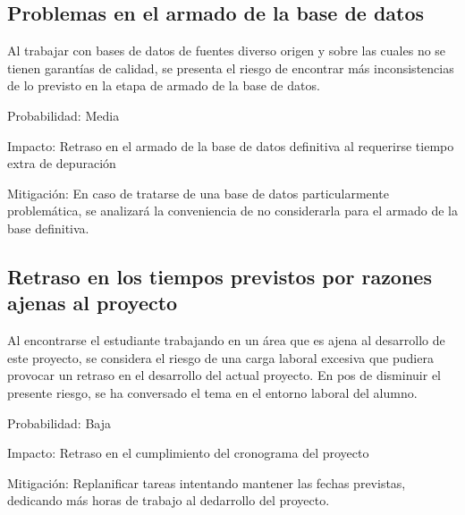 \documentclass[bibliography=openstyle,DIV=12]{scrartcl}
\begin{document}
\subsection{Problemas en el armado de la base de datos}
Al trabajar con bases de datos de fuentes diverso origen y sobre las cuales no se tienen
garantías de calidad, se presenta el riesgo de encontrar más inconsistencias de lo previsto
en la etapa de armado de la base de datos.
\begin{description*}
  \item[Probabilidad:] Media
  \item[Impacto:] Retraso en el armado de la base de datos definitiva al requerirse tiempo extra de depuración
  \item[Mitigación:] En caso de tratarse de una base de datos particularmente problemática, se analizará la
  conveniencia de no considerarla para el armado de la base definitiva.
\end{description*}
%
\subsection{Retraso en los tiempos previstos por razones ajenas al proyecto}
Al encontrarse el estudiante trabajando en un área que es ajena al desarrollo de este proyecto, se considera el riesgo de una carga laboral excesiva que pudiera provocar un retraso en el desarrollo del actual proyecto. En pos de disminuir el presente riesgo, se ha conversado el tema en el entorno laboral del alumno.
\begin{description*}
  \item[Probabilidad:] Baja
  \item[Impacto:] Retraso en el cumplimiento del cronograma del proyecto
  \item[Mitigación:] Replanificar tareas intentando mantener las fechas previstas, dedicando más horas de trabajo al dedarrollo del proyecto.
\end{description*}
%
\end{document}
